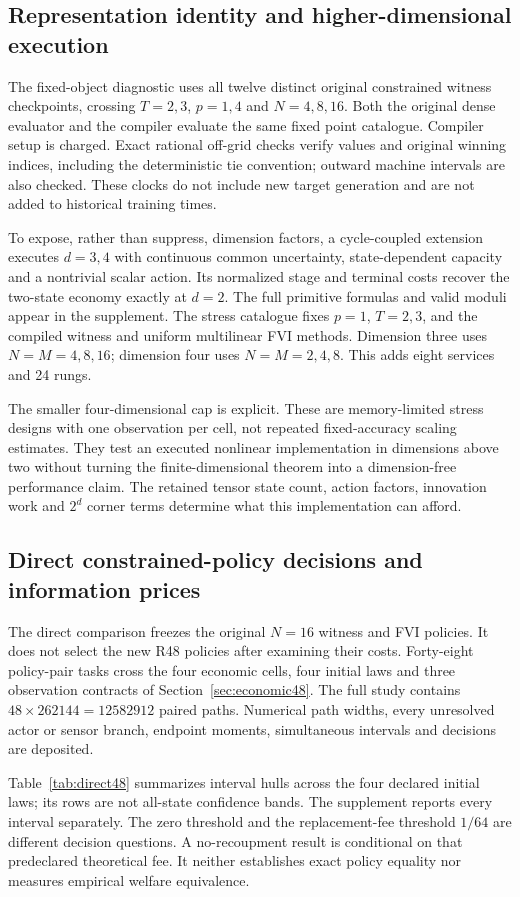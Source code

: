 



\subsection{Representation identity and higher-dimensional execution}
The fixed-object diagnostic uses all twelve distinct original constrained witness checkpoints, crossing $T=2,3$, $p=1,4$ and $N=4,8,16$. Both the original dense evaluator and the compiler evaluate the same fixed point catalogue. Compiler setup is charged. Exact rational off-grid checks verify values and original winning indices, including the deterministic tie convention; outward machine intervals are also checked. These clocks do not include new target generation and are not added to historical training times.


To expose, rather than suppress, dimension factors, a cycle-coupled extension executes $d=3,4$ with continuous common uncertainty, state-dependent capacity and a nontrivial scalar action. Its normalized stage and terminal costs recover the two-state economy exactly at $d=2$. The full primitive formulas and valid moduli appear in the supplement. The stress catalogue fixes $p=1$, $T=2,3$, and the compiled witness and uniform multilinear FVI methods. Dimension three uses $N=M=4,8,16$; dimension four uses $N=M=2,4,8$. This adds eight services and 24 rungs.

The smaller four-dimensional cap is explicit. These are memory-limited stress designs with one observation per cell, not repeated fixed-accuracy scaling estimates. They test an executed nonlinear implementation in dimensions above two without turning the finite-dimensional theorem into a dimension-free performance claim. The retained tensor state count, action factors, innovation work and $2^d$ corner terms determine what this implementation can afford.

\subsection{Direct constrained-policy decisions and information prices}
The direct comparison freezes the original $N=16$ witness and FVI policies. It does not select the new R48 policies after examining their costs. Forty-eight policy-pair tasks cross the four economic cells, four initial laws and three observation contracts of Section~\ref{sec:economic48}. The full study contains $48\times262144=12582912$ paired paths. Numerical path widths, every unresolved actor or sensor branch, endpoint moments, simultaneous intervals and decisions are deposited.

Table~\ref{tab:direct48} summarizes interval hulls across the four declared initial laws; its rows are not all-state confidence bands. The supplement reports every interval separately. The zero threshold and the replacement-fee threshold $1/64$ are different decision questions. A no-recoupment result is conditional on that predeclared theoretical fee. It neither establishes exact policy equality nor measures empirical welfare equivalence.

